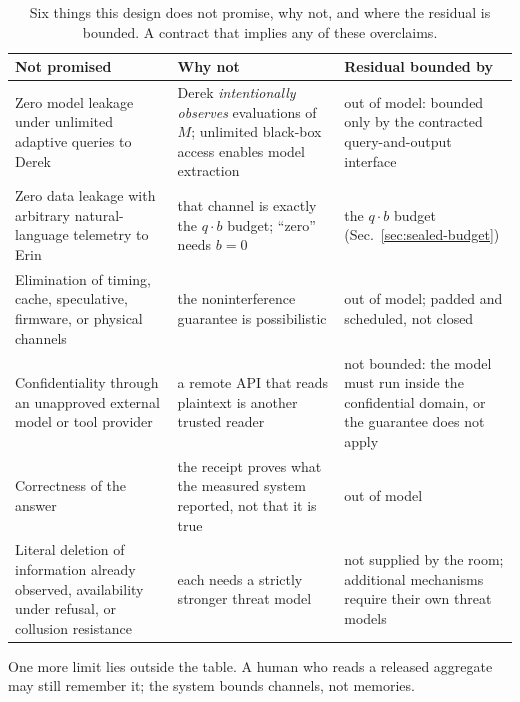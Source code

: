 \documentclass[11pt,a4paper]{article}
\theoremstyle{definition}
\begin{document}
\begin{table}[H]\centering\footnotesize
\caption{Six things this design does not promise, why not, and where the
residual is bounded. A contract that implies any of these overclaims.}
\label{tab:sealed-not-promised}
\begin{tabularx}{\textwidth}{@{}>{\raggedright\arraybackslash}p{3.5cm} >{\raggedright\arraybackslash}X >{\raggedright\arraybackslash}p{3.3cm}@{}}
\toprule
Not promised & Why not & Residual bounded by \\
\midrule
Zero model leakage under unlimited adaptive queries to Derek & Derek \emph{intentionally observes} evaluations of $M$; unlimited black-box access enables model extraction & out of model: bounded only by the contracted query-and-output interface \\
Zero data leakage with arbitrary natural-language telemetry to Erin & that channel is exactly the $q\cdot b$ budget; ``zero'' needs $b=0$ & the $q\cdot b$ budget (Sec.~\ref{sec:sealed-budget}) \\
Elimination of timing, cache, speculative, firmware, or physical channels & the noninterference guarantee is possibilistic & out of model; padded and scheduled, not closed \\
Confidentiality through an unapproved external model or tool provider & a remote API that reads plaintext is another trusted reader & not bounded: the model must run inside the confidential domain, or the guarantee does not apply \\
Correctness of the answer & the receipt proves what the measured system reported, not that it is true & out of model \\
Literal deletion of information already observed, availability under refusal, or collusion resistance & each needs a strictly stronger threat model & not supplied by the room; additional mechanisms require their own threat models \\
\bottomrule
\end{tabularx}
\end{table}

\FloatBarrier
One more limit lies outside the table. A human who reads a released
aggregate may still remember it; the system bounds channels, not memories.
\end{document}

